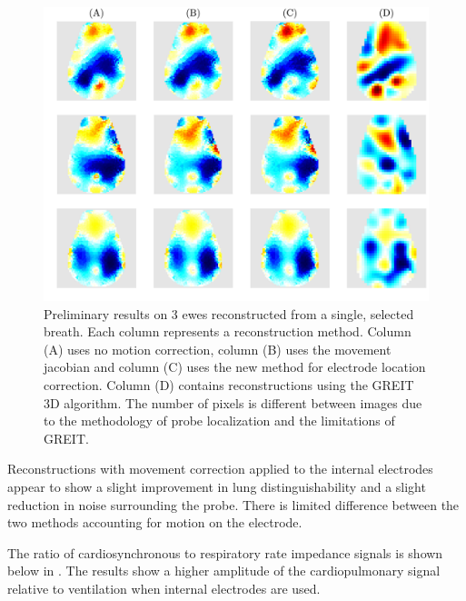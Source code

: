 \begin{figure}
    \centering
	\includegraphics[width=\textwidth]{chapter7-internal_elec_motion/imgs/lamb_reconstruction_all.pdf} 
	\caption[Results of the probe location correction]{\label{fig:internal_reconstructions} 
	Preliminary results on 3 ewes reconstructed 
	from a single, selected breath. Each column represents a reconstruction method. Column (A)
	uses no motion correction, column (B) uses the movement jacobian and column (C) uses the new method
	for electrode location correction. Column (D) contains reconstructions using the GREIT 3D algorithm.
	The number of pixels is different between images due to the methodology of probe localization and 
	the limitations of GREIT.}
\end{figure}

Reconstructions with movement correction applied to the internal electrodes appear to show a 
slight improvement in lung distinguishability and a slight reduction
in noise surrounding the probe. There is limited difference between the
two methods accounting for motion on the electrode.

The ratio of cardiosynchronous to respiratory rate impedance signals is shown below in 
. The results show a higher amplitude of the cardiopulmonary 
signal relative to ventilation when internal electrodes are used.

